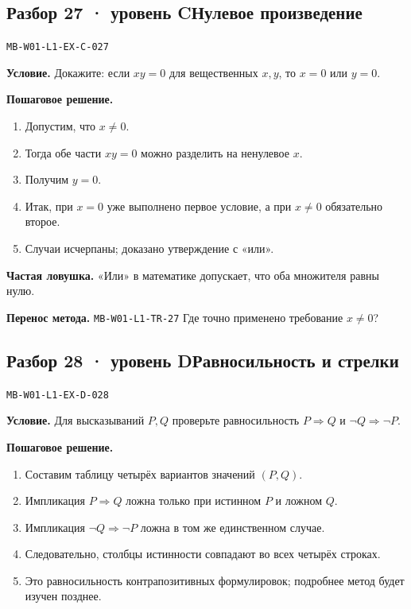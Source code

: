 \documentclass[11pt,a4paper,openany]{book}
\newcommand{\mtag}[1]{\textsf{\small\color{mbaccent}\bfseries #1}}
\newcommand{\muid}[1]{\texttt{\footnotesize #1}}
\begin{document}
\subsection*{\mtag{Разбор 27 · уровень C}\quad Нулевое произведение}\hypertarget{MB-W01-L1-EX-C-027}{}

\muid{MB-W01-L1-EX-C-027}\par

\begin{keybox}\textbf{Условие.} Докажите: если $xy=0$ для вещественных $x,y$, то $x=0$ или $y=0$.\end{keybox}

\textbf{Пошаговое решение.}\par
\begin{enumerate}[label=\arabic*),leftmargin=*,itemsep=3pt,topsep=4pt]
\item Допустим, что $x\ne0$.
\item Тогда обе части $xy=0$ можно разделить на ненулевое $x$.
\item Получим $y=0$.
\item Итак, при $x=0$ уже выполнено первое условие, а при $x\ne0$ обязательно второе.
\item Случаи исчерпаны; доказано утверждение с «или».
\end{enumerate}


\begin{learnbox}\textbf{Частая ловушка.} «Или» в математике допускает, что оба множителя равны нулю.\par \textbf{Перенос метода.} \muid{MB-W01-L1-TR-27} Где точно применено требование $x\ne0$?\end{learnbox}

\subsection*{\mtag{Разбор 28 · уровень D}\quad Равносильность и стрелки}\hypertarget{MB-W01-L1-EX-D-028}{}

\muid{MB-W01-L1-EX-D-028}\par

\begin{keybox}\textbf{Условие.} Для высказываний $P,Q$ проверьте равносильность $P\Rightarrow Q$ и $\neg Q\Rightarrow\neg P$.\end{keybox}

\textbf{Пошаговое решение.}\par
\begin{enumerate}[label=\arabic*),leftmargin=*,itemsep=3pt,topsep=4pt]
\item Составим таблицу четырёх вариантов значений $(P,Q)$.
\item Импликация $P\Rightarrow Q$ ложна только при истинном $P$ и ложном $Q$.
\item Импликация $\neg Q\Rightarrow\neg P$ ложна в том же единственном случае.
\item Следовательно, столбцы истинности совпадают во всех четырёх строках.
\item Это равносильность контрапозитивных формулировок; подробнее метод будет изучен позднее.
\end{enumerate}
\end{document}
